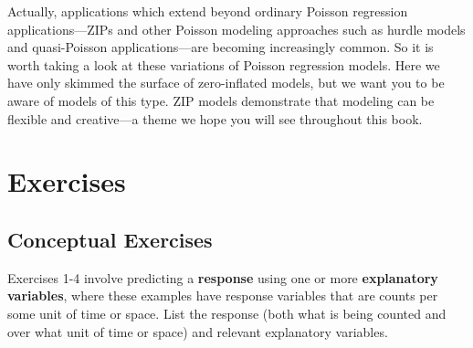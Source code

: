 \documentclass[
]{krantz}
\begin{document}
Actually, applications which extend beyond ordinary Poisson regression applications---ZIPs and other Poisson modeling approaches such as hurdle models and quasi-Poisson applications---are becoming increasingly common. So it is worth taking a look at these variations of Poisson regression models. Here we have only skimmed the surface of zero-inflated models, but we want you to be aware of models of this type. ZIP models demonstrate that modeling can be flexible and creative---a theme we hope you will see throughout this book.

\hypertarget{exercises-3}{%
\section{Exercises}\label{exercises-3}}

\hypertarget{exer:concept}{%
\subsection{Conceptual Exercises}\label{exer:concept}}

Exercises 1-4 involve predicting a \textbf{response} using one or more \textbf{explanatory variables}, where these examples have response variables that are counts per some unit of time or space. List the response (both what is being counted and over what unit of time or space) and relevant explanatory variables.
\end{document}
